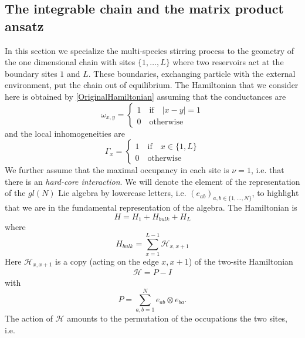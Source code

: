 \documentclass[11pt]{article}
\numberwithin{equation}{section}
\numberwithin{equation}{subsection}
\newcommand{\id}{I}
\begin{document}
\subsection{The integrable chain and the matrix product ansatz}
In this section we specialize the multi-species stirring process to the geometry of the one dimensional chain with sites $\{1,\ldots,L\}$ where two reservoirs act at the boundary sites $1$ and $L$. These boundaries, exchanging particle with the external environment, put the chain out of equilibrium. The Hamiltonian that we consider here is obtained by \eqref{OriginalHamiltonian} assuming that the conductances are
\begin{equation}
    \omega_{x,y}=\begin{cases}
    1 \quad \text{if}\quad |x-y|=1\\
    0\quad \text{otherwise}
    \end{cases}
\end{equation}
and the local inhomogeneities are
\begin{equation}
    \Gamma_{x}=\begin{cases}
        1\quad \text{if} \quad x\in \{1,L\}\\
        0\quad \text{otherwise}
    \end{cases}
    \end{equation}
We further assume that the maximal occupancy in each site is $\nu=1$, i.e. that there is an \textit{hard-core interaction}.
We will denote the element of the representation of the $gl(N)$ Lie algebra by lowercase letters, i.e. $(e_{ab})_{a,b\in\{1,\ldots,N\}}$, to highlight that we are in  the fundamental representation of the algebra.
The Hamiltonian is
\begin{equation}\label{hamiltonian}
	H=H_{1}+H_{bulk}+H_{L}
\end{equation}
where
\begin{equation}
    H_{bulk}=\sum_{x=1}^{L-1}\mathcal{H}_{x,x+1}
\end{equation}
Here $\mathcal{H}_{x,x+1}$  is a copy (acting on the edge $x,x+1$) of the two-site Hamiltonian
\begin{equation}
	\begin{split}
		\mathcal{H}=P-\id
	\end{split}
\end{equation}
with 
\begin{equation}
	P=\sum_{a,b=1}^Ne_{ab}\otimes e_{ba}.
\end{equation} 
The action of $\mathcal{H}$ amounts to the permutation of the occupations the two sites, i.e.
\end{document}
